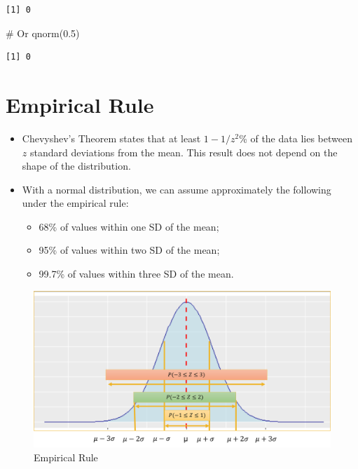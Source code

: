 \documentclass[
  letterpaper,
  DIV=11,
  numbers=noendperiod]{scrreprt}
\newenvironment{Shaded}{\begin{snugshade}}{\end{snugshade}}
\newcommand{\CommentTok}[1]{\textcolor[rgb]{0.37,0.37,0.37}{#1}}
\newcommand{\FloatTok}[1]{\textcolor[rgb]{0.68,0.00,0.00}{#1}}
\newcommand{\FunctionTok}[1]{\textcolor[rgb]{0.28,0.35,0.67}{#1}}
\newcommand{\NormalTok}[1]{\textcolor[rgb]{0.00,0.23,0.31}{#1}}
\providecommand{\tightlist}{%
  \setlength{\itemsep}{0pt}\setlength{\parskip}{0pt}}\usepackage{longtable,booktabs,array}
\begin{document}
\begin{verbatim}
[1] 0
\end{verbatim}

\begin{Shaded}
\begin{Highlighting}[]
\CommentTok{\# Or}
\FunctionTok{qnorm}\NormalTok{(}\FloatTok{0.5}\NormalTok{)}
\end{Highlighting}
\end{Shaded}

\begin{verbatim}
[1] 0
\end{verbatim}

\section{Empirical Rule}\label{empirical-rule}

\begin{itemize}
\item
  Chevyshev's Theorem states that at least \(1 - 1/z^2\)\% of the data
  lies between \(z\) standard deviations from the mean. This result does
  not depend on the shape of the distribution.
\item
  With a normal distribution, we can assume approximately the following
  under the empirical rule:

  \begin{itemize}
  \tightlist
  \item
    68\% of values within one SD of the mean;
  \item
    95\% of values within two SD of the mean;
  \item
    99.7\% of values within three SD of the mean.
  \end{itemize}
\end{itemize}

\begin{figure}[H]

{\centering \includegraphics{Pictures/Ch4/EmpiricalRule.png}

}

\caption{Empirical Rule}

\end{figure}%
\end{document}
